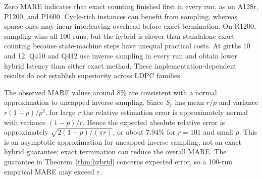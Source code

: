 Zero MARE indicates that exact counting finished first in every run,
as on A128r, P1200, and P1600. Cycle-rich instances can benefit
from sampling, whereas sparse ones may incur interleaving overhead
before exact termination. On R1200, sampling wins all 100 runs,
but the hybrid is slower than standalone exact counting because
state-machine steps have unequal practical costs. At girths 10
and 12, Q410 and Q412 use inverse sampling in every run and
obtain lower hybrid latency than either exact method. These
implementation-dependent results do not establish superiority
across LDPC families.

The observed MARE values around $8\%$ are consistent with a
normal approximation to uncapped inverse sampling. Since $S_r$
has mean $r/p$ and variance $r(1-p)/p^2$, for large $r$ the
relative estimation error is approximately normal with variance
$(1-p)/r$. Hence the expected absolute relative error is
approximately $\sqrt{2(1-p)/(\pi r)}$, or about $7.94\%$ for
$r=101$ and small $p$. This is an asymptotic approximation for
uncapped inverse sampling, not an exact hybrid guarantee;
exact termination can reduce the overall MARE. The guarantee
in Theorem~\ref{thm:hybrid} concerns expected error, so a
100-run empirical MARE may exceed $\varepsilon$.
